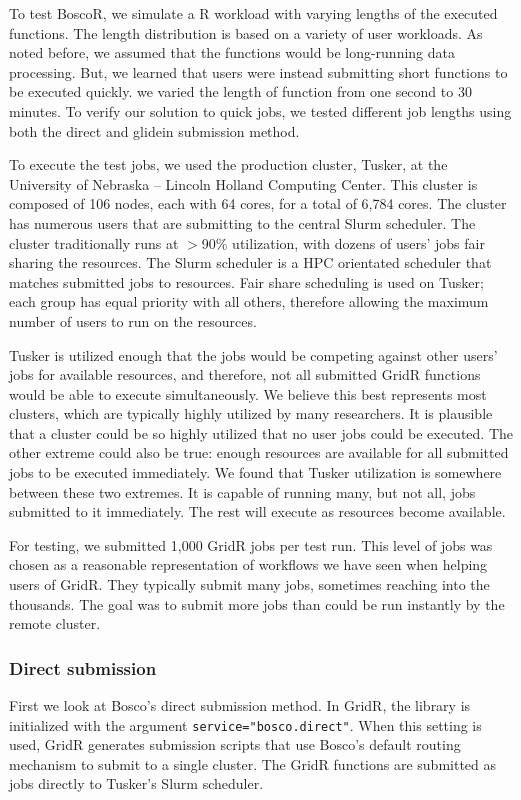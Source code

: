 To test BoscoR, we simulate a R workload with varying lengths of the executed functions.  The length distribution is based on a variety of user workloads.  As noted before, we assumed that the functions would be long-running data processing.  But, we learned that users were instead submitting short functions to be executed quickly.  we varied the length of function from one second to 30 minutes.  To verify our solution to quick jobs, we tested different job lengths using both the direct and glidein submission method.

To execute the test jobs, we used the production cluster, Tusker, at the University of Nebraska -- Lincoln Holland Computing Center.  This cluster is composed of 106 nodes, each with 64 cores, for a total of 6,784 cores.  The cluster has numerous users that are submitting to the central Slurm \cite{yoo2003slurm} scheduler.  The cluster traditionally runs at $>$90\% utilization, with dozens of users' jobs fair sharing the resources.  The Slurm scheduler is a HPC orientated scheduler that matches submitted jobs to resources.  Fair share scheduling is used on Tusker;  each group has equal priority with all others, therefore allowing the maximum number of users to run on the resources.

Tusker is utilized enough that the jobs would be competing against other users' jobs for available resources, and therefore, not all submitted GridR functions would be able to execute simultaneously.  We believe this best represents most clusters, which are typically highly utilized by many researchers.  It is plausible that a cluster could be so highly utilized that no user jobs could be executed. The other extreme could also be true: enough resources are available for all submitted jobs to be executed immediately.  We found that Tusker utilization is somewhere between these two extremes.  It is capable of running many, but not all, jobs submitted to it immediately.  The rest will execute as resources become available.

For testing, we submitted 1,000 GridR jobs per test run. This level of jobs was chosen as a reasonable representation of workflows we have seen when helping users of GridR.  They typically submit many jobs, sometimes reaching into the thousands.  The goal was to submit more jobs than could be run instantly by the remote cluster.

\subsubsection{Direct submission}
First we look at Bosco's direct submission method.  In GridR, the library is initialized with the argument \texttt{service="bosco.direct"}.  When this setting is used, GridR generates submission scripts that use Bosco's default routing mechanism to submit to a single cluster.  The GridR functions are submitted as jobs directly to Tusker's Slurm scheduler.


